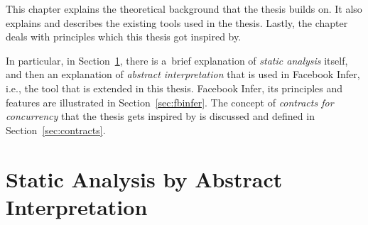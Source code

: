 This chapter explains the theoretical background that the thesis builds
on. It also explains and describes the existing tools used in the
thesis. Lastly, the chapter deals with principles which this thesis
got inspired by.

In particular, in Section~\ref{sec:statAnalysisAI}, there is a~brief
explanation of \emph{static analysis} itself, and then an explanation of
\emph{abstract interpretation} that is used in Facebook Infer, i.e., the
tool that is extended in this thesis. Facebook Infer, its principles and
features are illustrated in Section~\ref{sec:fbinfer}. The concept of
\emph{contracts for concurrency} that the thesis gets inspired by is
discussed and defined in Section~\ref{sec:contracts}.


\section{Static Analysis by Abstract Interpretation}
\label{sec:statAnalysisAI}

